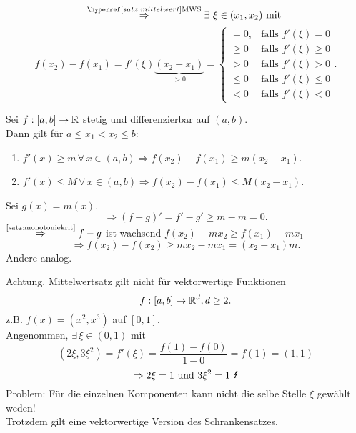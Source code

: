 \documentclass[../ana1.tex]{subfiles}
\begin{document}
\begin{bew}
    \[ \overref{satz:mittelwert}{MWS}{\Rightarrow} \exists \, 
    \xi \in (x_1, x_2) \text{ mit } \]
    \[ f(x_2) - f(x_1) = f'(\xi) \underbrace{(x_2 - x_1)}_{>0}
    = \begin{cases}
        =0, & \text{falls } f'(\xi) = 0\\
        \geq 0 &\text{falls } f'(\xi) \geq 0\\
        > 0 &\text{falls } f'(\xi) > 0\\
        \leq 0 &\text{falls } f'(\xi) \leq 0\\
        < 0 &\text{falls } f'(\xi) < 0
    \end{cases}. \]
\end{bew}
\begin{kor}[Schrankensatz]\label{satz:schranken}
    Sei \( f: [a,b] \rightarrow \mathbb{R} \) stetig und differenzierbar 
    auf \( (a,b) \).\\
    Dann gilt für \( a \leq x_1 < x_2 \leq b \): 
    \begin{enumerate}
        \item \( f'(x) \geq m \,\forall \, x \in (a,b) 
        \Rightarrow f(x_2) - f(x_1) \geq m(x_2 - x_1) \).
        \item \( f'(x) \leq M \, \forall \, x\in (a,b) 
        \Rightarrow f(x_2) - f(x_1) \leq M(x_2 - x_1) \).
    \end{enumerate}
\end{kor}
\begin{bew}
    Sei \( g(x) = m(x) \).
    \[ \Rightarrow (f - g)' = f' - g' \geq m - m = 0. \]
    \( \oversett{\autoref{satz:monotoniekrit}}{\Rightarrow} 
    f - g \) ist wachsend \dphp{} \( f(x_2) - m x_2 \geq 
    f(x_1) - m x_1 \) 
    \[ \Rightarrow f(x_2) - f(x_2) \geq m x_2 - m x_1 
    = (x_2 - x_1)m. \]
    Andere analog.
\end{bew}
\begin{bsp}%
    Achtung. Mittelwertsatz gilt nicht für 
    vektorwertige Funktionen
    \[ f: [a,b] \rightarrow \mathbb{R}^d, d \geq 2. \]
    z.B. \( f(x) = (x^2,x^3) \) auf \( [0,1] \). \\
    Angenommen, \( \exists \, \xi \in (0,1) \) mit 
    \[ (2\xi, 3\xi^2) = f'(\xi) = \frac{f(1) - f(0)}{1-0} 
    = f(1) = (1,1) \]
    \[ \Rightarrow 2\xi = 1 \text{ und } 3\xi^2 = 1 \text{ \Lightning{}} \]
    Problem: Für die einzelnen Komponenten kann nicht die selbe Stelle 
    \( \xi \) gewählt weden!\\
    Trotzdem gilt eine vektorwertige Version des Schrankensatzes.    
\end{bsp}
\end{document}
